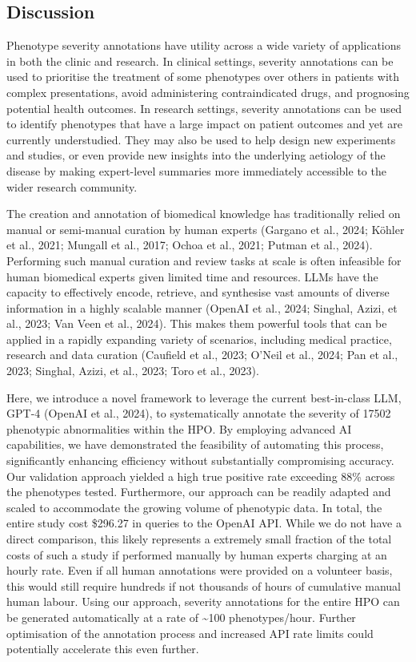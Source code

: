 \documentclass[
]{agujournal2019}
\begin{document}
\subsection{Discussion}\label{discussion}

Phenotype severity annotations have utility across a wide variety of
applications in both the clinic and research. In clinical settings,
severity annotations can be used to prioritise the treatment of some
phenotypes over others in patients with complex presentations, avoid
administering contraindicated drugs, and prognosing potential health
outcomes. In research settings, severity annotations can be used to
identify phenotypes that have a large impact on patient outcomes and yet
are currently understudied. They may also be used to help design new
experiments and studies, or even provide new insights into the
underlying aetiology of the disease by making expert-level summaries
more immediately accessible to the wider research community.

The creation and annotation of biomedical knowledge has traditionally
relied on manual or semi-manual curation by human experts (Gargano et
al., 2024; Köhler et al., 2021; Mungall et al., 2017; Ochoa et al.,
2021; Putman et al., 2024). Performing such manual curation and review
tasks at scale is often infeasible for human biomedical experts given
limited time and resources. LLMs have the capacity to effectively
encode, retrieve, and synthesise vast amounts of diverse information in
a highly scalable manner (OpenAI et al., 2024; Singhal, Azizi, et al.,
2023; Van Veen et al., 2024). This makes them powerful tools that can be
applied in a rapidly expanding variety of scenarios, including medical
practice, research and data curation (Caufield et al., 2023; O'Neil et
al., 2024; Pan et al., 2023; Singhal, Azizi, et al., 2023; Toro et al.,
2023).

Here, we introduce a novel framework to leverage the current
best-in-class LLM, GPT-4 (OpenAI et al., 2024), to systematically
annotate the severity of 17502 phenotypic abnormalities within the HPO.
By employing advanced AI capabilities, we have demonstrated the
feasibility of automating this process, significantly enhancing
efficiency without substantially compromising accuracy. Our validation
approach yielded a high true positive rate exceeding 88\% across the
phenotypes tested. Furthermore, our approach can be readily adapted and
scaled to accommodate the growing volume of phenotypic data. In total,
the entire study cost \$296.27 in queries to the OpenAI API. While we do
not have a direct comparison, this likely represents a extremely small
fraction of the total costs of such a study if performed manually by
human experts charging at an hourly rate. Even if all human annotations
were provided on a volunteer basis, this would still require hundreds if
not thousands of hours of cumulative manual human labour. Using our
approach, severity annotations for the entire HPO can be generated
automatically at a rate of \textasciitilde100 phenotypes/hour. Further
optimisation of the annotation process and increased API rate limits
could potentially accelerate this even further.
\end{document}
